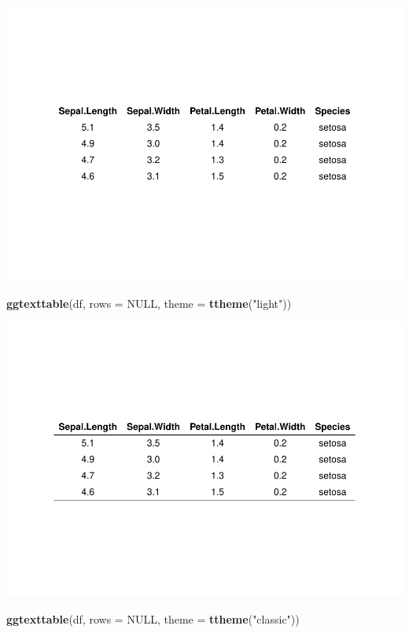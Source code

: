 \documentclass[
]{book}
\newenvironment{Shaded}{\begin{snugshade}}{\end{snugshade}}
\newcommand{\AttributeTok}[1]{\textcolor[rgb]{0.13,0.29,0.53}{#1}}
\newcommand{\ConstantTok}[1]{\textcolor[rgb]{0.56,0.35,0.01}{#1}}
\newcommand{\FunctionTok}[1]{\textcolor[rgb]{0.13,0.29,0.53}{\textbf{#1}}}
\newcommand{\NormalTok}[1]{#1}
\newcommand{\StringTok}[1]{\textcolor[rgb]{0.31,0.60,0.02}{#1}}
\begin{document}
\includegraphics{_main_files/figure-latex/unnamed-chunk-232-1.pdf}

\begin{Shaded}
\begin{Highlighting}[]
\FunctionTok{ggtexttable}\NormalTok{(df, }\AttributeTok{rows =} \ConstantTok{NULL}\NormalTok{, }\AttributeTok{theme =} \FunctionTok{ttheme}\NormalTok{(}\StringTok{"light"}\NormalTok{))}
\end{Highlighting}
\end{Shaded}

\includegraphics{_main_files/figure-latex/unnamed-chunk-232-2.pdf}

\begin{Shaded}
\begin{Highlighting}[]
\FunctionTok{ggtexttable}\NormalTok{(df, }\AttributeTok{rows =} \ConstantTok{NULL}\NormalTok{, }\AttributeTok{theme =} \FunctionTok{ttheme}\NormalTok{(}\StringTok{"classic"}\NormalTok{))}
\end{Highlighting}
\end{Shaded}
\end{document}
